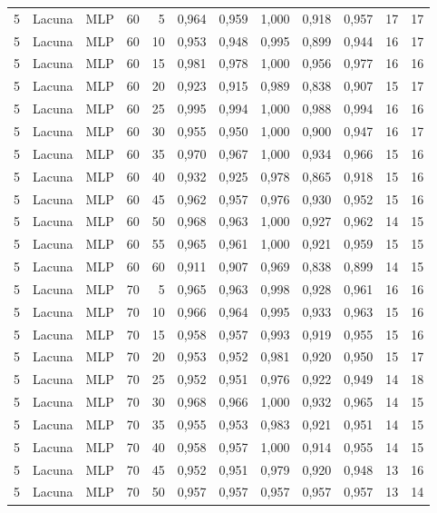 \begin{longtable}{@{}rllrrrrrrrrr@{}}
5 & Lacuna & MLP & 60 & 5 & 0,964 & 0,959 & 1,000 & 0,918 & 0,957 & 17 & 17 \\
5 & Lacuna & MLP & 60 & 10 & 0,953 & 0,948 & 0,995 & 0,899 & 0,944 & 16 & 17 \\
5 & Lacuna & MLP & 60 & 15 & 0,981 & 0,978 & 1,000 & 0,956 & 0,977 & 16 & 16 \\
5 & Lacuna & MLP & 60 & 20 & 0,923 & 0,915 & 0,989 & 0,838 & 0,907 & 15 & 17 \\
5 & Lacuna & MLP & 60 & 25 & 0,995 & 0,994 & 1,000 & 0,988 & 0,994 & 16 & 16 \\
5 & Lacuna & MLP & 60 & 30 & 0,955 & 0,950 & 1,000 & 0,900 & 0,947 & 16 & 17 \\
5 & Lacuna & MLP & 60 & 35 & 0,970 & 0,967 & 1,000 & 0,934 & 0,966 & 15 & 16 \\
5 & Lacuna & MLP & 60 & 40 & 0,932 & 0,925 & 0,978 & 0,865 & 0,918 & 15 & 16 \\
5 & Lacuna & MLP & 60 & 45 & 0,962 & 0,957 & 0,976 & 0,930 & 0,952 & 15 & 16 \\
5 & Lacuna & MLP & 60 & 50 & 0,968 & 0,963 & 1,000 & 0,927 & 0,962 & 14 & 15 \\
5 & Lacuna & MLP & 60 & 55 & 0,965 & 0,961 & 1,000 & 0,921 & 0,959 & 15 & 15 \\
5 & Lacuna & MLP & 60 & 60 & 0,911 & 0,907 & 0,969 & 0,838 & 0,899 & 14 & 15 \\
5 & Lacuna & MLP & 70 & 5 & 0,965 & 0,963 & 0,998 & 0,928 & 0,961 & 16 & 16 \\
5 & Lacuna & MLP & 70 & 10 & 0,966 & 0,964 & 0,995 & 0,933 & 0,963 & 15 & 16 \\
5 & Lacuna & MLP & 70 & 15 & 0,958 & 0,957 & 0,993 & 0,919 & 0,955 & 15 & 16 \\
5 & Lacuna & MLP & 70 & 20 & 0,953 & 0,952 & 0,981 & 0,920 & 0,950 & 15 & 17 \\
5 & Lacuna & MLP & 70 & 25 & 0,952 & 0,951 & 0,976 & 0,922 & 0,949 & 14 & 18 \\
5 & Lacuna & MLP & 70 & 30 & 0,968 & 0,966 & 1,000 & 0,932 & 0,965 & 14 & 15 \\
5 & Lacuna & MLP & 70 & 35 & 0,955 & 0,953 & 0,983 & 0,921 & 0,951 & 14 & 15 \\
5 & Lacuna & MLP & 70 & 40 & 0,958 & 0,957 & 1,000 & 0,914 & 0,955 & 14 & 15 \\
5 & Lacuna & MLP & 70 & 45 & 0,952 & 0,951 & 0,979 & 0,920 & 0,948 & 13 & 16 \\
5 & Lacuna & MLP & 70 & 50 & 0,957 & 0,957 & 0,957 & 0,957 & 0,957 & 13 & 14 \\

\end{longtable}
